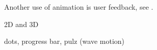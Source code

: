 Another use of animation is user feedback, see .

\label{subsub:rotation_loader}
2D and 3D

\label{subsub:menu}

dots, progress bar, pulz (wave motion)

